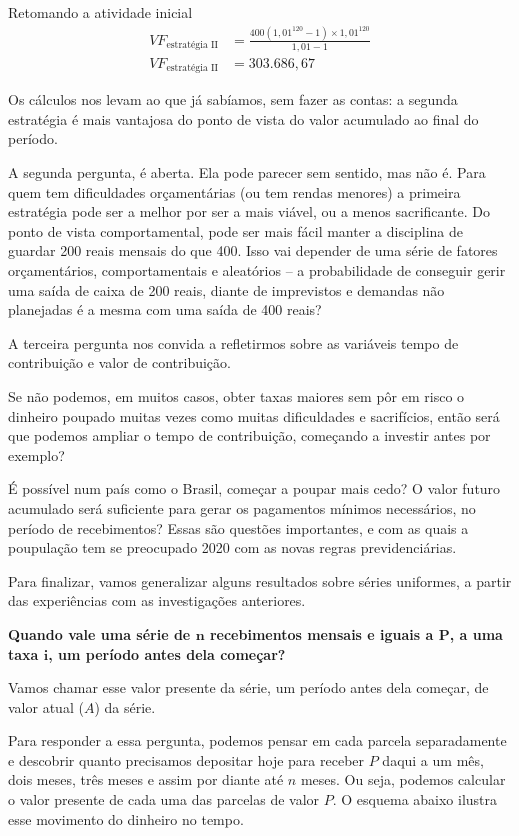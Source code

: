 \begin{example}{Retomando a atividade inicial}
\begin{align*}
\mathit{VF}_{\text{estratégia II}}&=\frac{400(1,01^{120}-1)\times1{,}01^{120}}{1,01-1}\\
\mathit{VF}_{\text{estratégia II}}&=303.686,67
\end{align*}

Os cálculos nos levam ao que já sabíamos, sem fazer as contas: a segunda estratégia é mais vantajosa do ponto de vista do valor acumulado ao final do período.

A segunda pergunta, é aberta. Ela pode parecer sem sentido, mas não é. Para quem tem dificuldades orçamentárias (ou tem rendas menores) a primeira estratégia pode ser a melhor por ser a mais viável, ou a menos sacrificante. Do ponto de vista comportamental, pode ser mais fácil manter a disciplina de guardar 200 reais mensais do que 400. Isso vai depender de uma série de fatores orçamentários, comportamentais e aleatórios – a probabilidade de conseguir gerir uma saída de caixa de 200 reais, diante de imprevistos e demandas não planejadas é a mesma com uma saída de 400 reais?

A terceira pergunta nos convida a refletirmos sobre as variáveis tempo de contribuição e valor de contribuição. 
\end{example}

Se não podemos, em muitos casos, obter taxas maiores sem pôr em risco o dinheiro poupado muitas vezes como muitas dificuldades e sacrifícios, então será que podemos ampliar o tempo de contribuição, começando a investir antes por exemplo? 

É possível num país como o Brasil, começar a poupar mais cedo? O valor futuro acumulado será suficiente para gerar os pagamentos mínimos necessários, no período de recebimentos? Essas são questões importantes, e com as quais a poupulação tem se preocupado 2020 com as novas regras previdenciárias.

Para finalizar, vamos generalizar alguns resultados sobre séries uniformes, a partir das experiências com as investigações anteriores.

\textbf{Quando vale uma série de $\bm{n}$ recebimentos mensais e iguais a $\bm{P}$, a uma taxa $\bm{i}$, um período antes dela começar?}

Vamos chamar esse valor presente da série, um período antes dela começar, de valor atual ($A$) da série.

Para responder a essa pergunta, podemos pensar em cada parcela separadamente e descobrir quanto precisamos depositar hoje para receber $P$ daqui a um mês, dois meses, três meses e assim por diante até $n$ meses. Ou seja, podemos calcular o valor presente de cada uma das parcelas de valor $P$. O esquema abaixo ilustra esse movimento do dinheiro no tempo.

